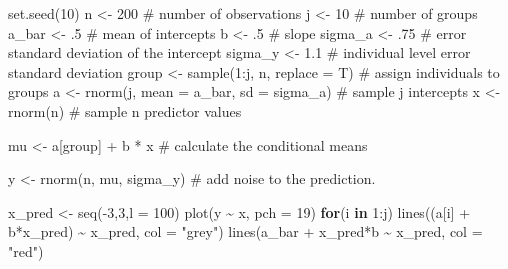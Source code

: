 \documentclass[
  letterpaper,
  DIV=11,
  numbers=noendperiod]{scrartcl}
\newenvironment{Shaded}{\begin{snugshade}}{\end{snugshade}}
\newcommand{\AttributeTok}[1]{\textcolor[rgb]{0.40,0.45,0.13}{#1}}
\newcommand{\CommentTok}[1]{\textcolor[rgb]{0.37,0.37,0.37}{#1}}
\newcommand{\ControlFlowTok}[1]{\textcolor[rgb]{0.00,0.23,0.31}{\textbf{#1}}}
\newcommand{\DecValTok}[1]{\textcolor[rgb]{0.68,0.00,0.00}{#1}}
\newcommand{\FloatTok}[1]{\textcolor[rgb]{0.68,0.00,0.00}{#1}}
\newcommand{\FunctionTok}[1]{\textcolor[rgb]{0.28,0.35,0.67}{#1}}
\newcommand{\NormalTok}[1]{\textcolor[rgb]{0.00,0.23,0.31}{#1}}
\newcommand{\OtherTok}[1]{\textcolor[rgb]{0.00,0.23,0.31}{#1}}
\newcommand{\SpecialCharTok}[1]{\textcolor[rgb]{0.37,0.37,0.37}{#1}}
\newcommand{\StringTok}[1]{\textcolor[rgb]{0.13,0.47,0.30}{#1}}
\begin{document}
\begin{Shaded}
\begin{Highlighting}[]
\FunctionTok{set.seed}\NormalTok{(}\DecValTok{10}\NormalTok{)}
\NormalTok{n }\OtherTok{\textless{}{-}} \DecValTok{200} \CommentTok{\# number of observations}
\NormalTok{j }\OtherTok{\textless{}{-}} \DecValTok{10} \CommentTok{\# number of groups}
\NormalTok{a\_bar }\OtherTok{\textless{}{-}}\NormalTok{ .}\DecValTok{5} \CommentTok{\# mean of intercepts}
\NormalTok{b }\OtherTok{\textless{}{-}}\NormalTok{ .}\DecValTok{5} \CommentTok{\# slope}
\NormalTok{sigma\_a }\OtherTok{\textless{}{-}}\NormalTok{ .}\DecValTok{75} \CommentTok{\# error standard deviation of the intercept}
\NormalTok{sigma\_y }\OtherTok{\textless{}{-}} \FloatTok{1.1} \CommentTok{\# individual level error standard deviation}
\NormalTok{group }\OtherTok{\textless{}{-}} \FunctionTok{sample}\NormalTok{(}\DecValTok{1}\SpecialCharTok{:}\NormalTok{j, n, }\AttributeTok{replace =}\NormalTok{ T) }\CommentTok{\# assign individuals to groups}
\NormalTok{a }\OtherTok{\textless{}{-}} \FunctionTok{rnorm}\NormalTok{(j, }\AttributeTok{mean =}\NormalTok{ a\_bar, }\AttributeTok{sd =}\NormalTok{ sigma\_a) }\CommentTok{\# sample j intercepts}
\NormalTok{x }\OtherTok{\textless{}{-}} \FunctionTok{rnorm}\NormalTok{(n) }\CommentTok{\# sample n predictor values}

\NormalTok{mu }\OtherTok{\textless{}{-}}\NormalTok{ a[group] }\SpecialCharTok{+}\NormalTok{ b }\SpecialCharTok{*}\NormalTok{ x }\CommentTok{\# calculate the conditional means}

\NormalTok{y }\OtherTok{\textless{}{-}} \FunctionTok{rnorm}\NormalTok{(n, mu, sigma\_y) }\CommentTok{\# add noise to the prediction.}

\NormalTok{x\_pred }\OtherTok{\textless{}{-}} \FunctionTok{seq}\NormalTok{(}\SpecialCharTok{{-}}\DecValTok{3}\NormalTok{,}\DecValTok{3}\NormalTok{,}\AttributeTok{l =} \DecValTok{100}\NormalTok{)}
\FunctionTok{plot}\NormalTok{(y }\SpecialCharTok{\textasciitilde{}}\NormalTok{ x, }\AttributeTok{pch =} \DecValTok{19}\NormalTok{)}
\ControlFlowTok{for}\NormalTok{(i }\ControlFlowTok{in} \DecValTok{1}\SpecialCharTok{:}\NormalTok{j) }\FunctionTok{lines}\NormalTok{((a[i] }\SpecialCharTok{+}\NormalTok{ b}\SpecialCharTok{*}\NormalTok{x\_pred) }\SpecialCharTok{\textasciitilde{}}\NormalTok{ x\_pred, }\AttributeTok{col =} \StringTok{"grey"}\NormalTok{)}
\FunctionTok{lines}\NormalTok{(a\_bar }\SpecialCharTok{+}\NormalTok{ x\_pred}\SpecialCharTok{*}\NormalTok{b }\SpecialCharTok{\textasciitilde{}}\NormalTok{ x\_pred, }\AttributeTok{col =} \StringTok{"red"}\NormalTok{)}
\end{Highlighting}
\end{Shaded}
\end{document}
